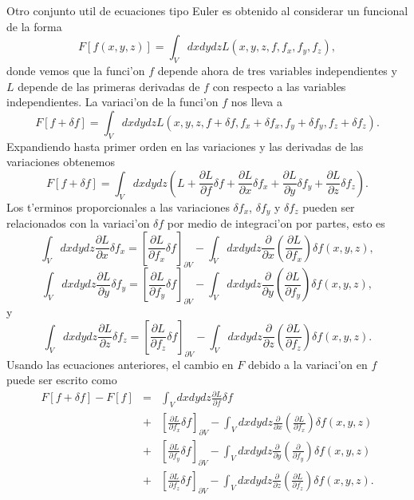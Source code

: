 Otro conjunto util de ecuaciones tipo Euler es obtenido al considerar un
funcional de la forma
\begin{equation}
F\left[ f(x,y,z)\right]=\int_Vdxdydz L(x, y, z, f, f_x, f_y, f_z),
\end{equation}
donde vemos que la funci'on $f$ depende ahora de tres variables independientes y
$L$ depende de las primeras derivadas de $f$ con respecto a las variables
independientes.
La variaci'on de la funci'on $f$ nos lleva a
\begin{equation}
F\left[ f+\delta f\right]=\int_Vdxdydz
L(x, y, z, f+\delta f, f_x+\delta f_x, f_y+\delta f_y, f_z+\delta f_z).
\end{equation}
Expandiendo hasta primer orden en las variaciones y las derivadas de las
variaciones obtenemos
\begin{equation}
F\left[ f+\delta f\right]=\int_Vdxdydz
\left( 
L+
\frac{\partial L}{\partial f}\delta f+
\frac{\partial L}{\partial x}\delta f_x+
\frac{\partial L}{\partial y}\delta f_y+
\frac{\partial L}{\partial z}\delta f_z
\right). 
\end{equation}
Los t'erminos proporcionales a las variaciones $\delta f_x$, $\delta f_y$ y
$\delta f_z$ pueden ser relacionados con la variaci'on $\delta f$ por medio de
integraci'on por partes,
esto es
\begin{equation}
\int_Vdxdydz\frac{\partial L}{\partial x}\delta f_x=
\left[ \frac{\partial L}{\partial f_x}\delta f\right]_{\partial V}-
\int_V dxdydz \frac{\partial}{\partial x}
\left( 
\frac{\partial L}{\partial f_x}
\right)  \delta f(x,y,z),
\end{equation}
\begin{equation}
\int_Vdxdydz\frac{\partial L}{\partial y}\delta f_y=
\left[ \frac{\partial L}{\partial f_y}\delta f\right]_{\partial V}-
\int_V dxdydz \frac{\partial}{\partial y}
\left( 
\frac{\partial L}{\partial f_y}
\right)  \delta f(x,y,z),
\end{equation}
y
\begin{equation}
\int_Vdxdydz\frac{\partial L}{\partial z}\delta f_z=
\left[ \frac{\partial L}{\partial f_z}\delta f\right]_{\partial V}-
\int_V dxdydz \frac{\partial}{\partial z}
\left( 
\frac{\partial L}{\partial f_z}
\right)  \delta f(x,y,z).
\end{equation}
Usando las ecuaciones anteriores, el cambio en $F$ debido a la variaci'on en $f$
puede ser escrito como
\begin{eqnarray}
F\left[ f+\delta f\right]-F\left[ f\right]&=&
\int_Vdxdydz \frac{\partial L}{\partial f}\delta f
\nonumber
\\
&+&
\left[ \frac{\partial L}{\partial f_x}\delta f\right]_{\partial V}
-
\int_V dxdydz \frac{\partial}{\partial x}
\left( 
\frac{\partial L}{\partial f_x}
\right)  \delta f(x,y,z)
\nonumber
\\
&+&
\left[ \frac{\partial L}{\partial f_y}\delta f\right]_{\partial V}
-
\int_V dxdydz \frac{\partial}{\partial y}
\left( 
\frac{\partial }{\partial f_y}
\right)  \delta f(x,y,z)
\nonumber
\\
&+&
\left[ \frac{\partial L}{\partial f_z}\delta f\right]_{\partial V}
-
\int_V dxdydz \frac{\partial}{\partial z}
\left( 
\frac{\partial L}{\partial f_z}
\right)  \delta f(x,y,z).
\end{eqnarray}
